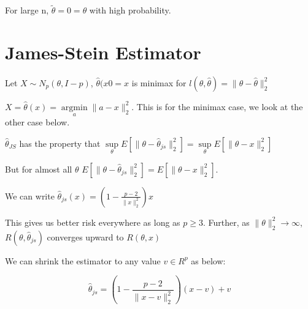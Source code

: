 \documentclass[10pt]{article}
\DeclareMathOperator*{\argmin}{argmin}
\renewcommand{\hat}{\widehat}
\begin{document}
	For large n, $\tilde{\theta} = 0 = \theta$ with high probability. 
	
	\section*{James-Stein Estimator}
	Let $X\sim N_p(\theta, I-p)$, $\hat{\theta}(x0 = x$ is minimax for $l(\theta,\hat{\theta})=\lVert\theta-\hat{\theta} \rVert_2^2$
	
	$X = \hat\theta(x) = \argmin\limits_{a} \lVert a-x \rVert_2^2$. This is for the minimax case, we look at the other case below.
	
	$\hat\theta_{JS}$ has the property that  $\sup\limits_\theta E\left[ \lVert\theta-\hat{\theta}_{js} \rVert_2^2\right] = \sup\limits_\theta E\left[ \lVert\theta-x \rVert_2^2\right]$
	
	But for almost all $\theta$ $E\left[ \lVert\theta-\hat{\theta}_{js} \rVert_2^2\right] = E\left[ \lVert\theta-x \rVert_2^2\right]$.
	
	We can write $\hat{\theta}_{js}(x) = \left( 1-\frac{p-2}{\lVert x \rVert^2_2}\right)x $
	
	This gives us better risk everywhere as long as $p\geq3$. Further, as $\lVert\theta\rVert^2_2 \rightarrow \infty$, $R(\theta,\hat\theta_{js})$ converges upward to $R(\theta,x)$
	
	We can shrink the estimator to any value $v\in R^p$ as below:
	
	$$ \hat\theta_{js} = \left( 1- \frac{p-2}{\lVert x-v \rVert^2_2}\right)(x-v) + v$$
	
	
	
	
	
\end{document}
